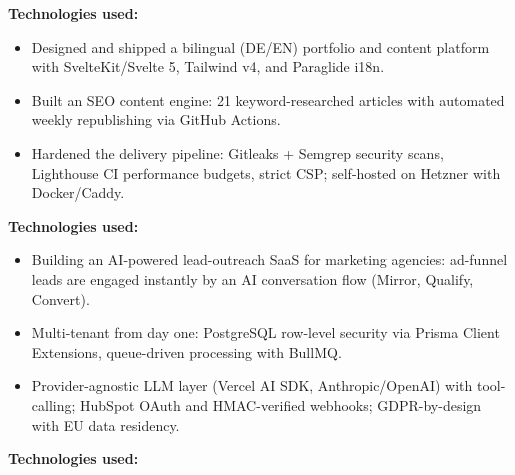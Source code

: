 \documentclass[10pt,a4paper,normalphoto]{altacv}
\begin{document}
\begin{fullwidth}
\textbf{Technologies used:}\\[0.4em]

\vspace{1.5em}

\begin{itemize}
    \item Designed and shipped a bilingual (DE/EN) portfolio and content platform with SvelteKit/Svelte 5, Tailwind v4, and Paraglide i18n.
    \item Built an SEO content engine: 21 keyword-researched articles with automated weekly republishing via GitHub Actions.
    \item Hardened the delivery pipeline: Gitleaks + Semgrep security scans, Lighthouse CI performance budgets, strict CSP; self-hosted on Hetzner with Docker/Caddy.
\end{itemize}

\textbf{Technologies used:}\\[0.4em]

\vspace{1.5em}

\begin{itemize}
    \item Building an AI-powered lead-outreach SaaS for marketing agencies: ad-funnel leads are engaged instantly by an AI conversation flow (Mirror, Qualify, Convert).
    \item Multi-tenant from day one: PostgreSQL row-level security via Prisma Client Extensions, queue-driven processing with BullMQ.
    \item Provider-agnostic LLM layer (Vercel AI SDK, Anthropic/OpenAI) with tool-calling; HubSpot OAuth and HMAC-verified webhooks; GDPR-by-design with EU data residency.
\end{itemize}

\textbf{Technologies used:}\\[0.4em]


\end{fullwidth}
\end{document}
